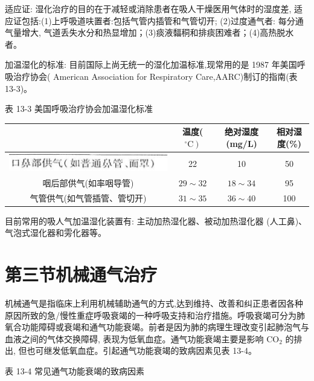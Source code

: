 \documentclass[10pt]{article}
\begin{document}
适应证: 湿化治疗的目的在于减轻或消除患者在吸人干燥医用气体时的湿度差, 适应证包括:(1)上呼吸道呋置者:包括气管内插管和气管切开; (2)过度通气者: 每分通气量增大, 气道丢失水分和热显增加；(3)痰液䵗秱和排痰困难者；(4)高热脱水者。

加温湿化的标准: 目前国际上尚无统一的湿化加温标准,现常用的是 1987 年美国呼吸治疗协会( American Association for Respiratory Care,AARC)制订的指南(表 13-3)。

表 13-3 美国呼吸治疗协会加温湿化标准

\begin{center}
\begin{tabular}{|c|c|c|c|}
\hline
 & 温度( $\left.{ }^{\circ} \mathrm{C}\right)$ & 绝对湿度(mg/L) & 相对湿度(\%) \\
\hline
\includegraphics[max width=\textwidth]{2024_07_09_002a177993bd97d1d6d7g-142}
 & 22 & 10 & 50 \\
\hline
咽后部供气(如率咽导管) & $29 \sim 32$ & $18 \sim 34$ & 95 \\
\hline
气管供气(如气管插管、管切开) & $31 \sim 35$ & $36 \sim 40$ & 100 \\
\hline
\end{tabular}
\end{center}

目前常用的吸人气加温湿化装置有: 主动加热湿化器、被动加热湿化器 (人工鼻)、气泡式湿化器和雱化器等。

\section*{第三节机械通气治疗}
机械通气是指临床上利用机械辅助通气的方式,达到维持、改善和纠正患者因各种原因所致的急/慢性重症呼吸衰竭的一种呼吸支持和治疗措施。呼吸衰竭可分为肺氧合功能障碍或衰竭和通气功能衰竭。前者是因为肺的病理生理改变引起肺泡气与血液之间的气体交换障碍, 表现为低氧血症。通气功能衰竭主要是影响 $\mathrm{CO}_{2}$ 的排出, 但也可继发低氧血症。引起通气功能衰竭的致病因素见表 13-4。

表 13-4 常见通气功能衰竭的致病因素
\end{document}
